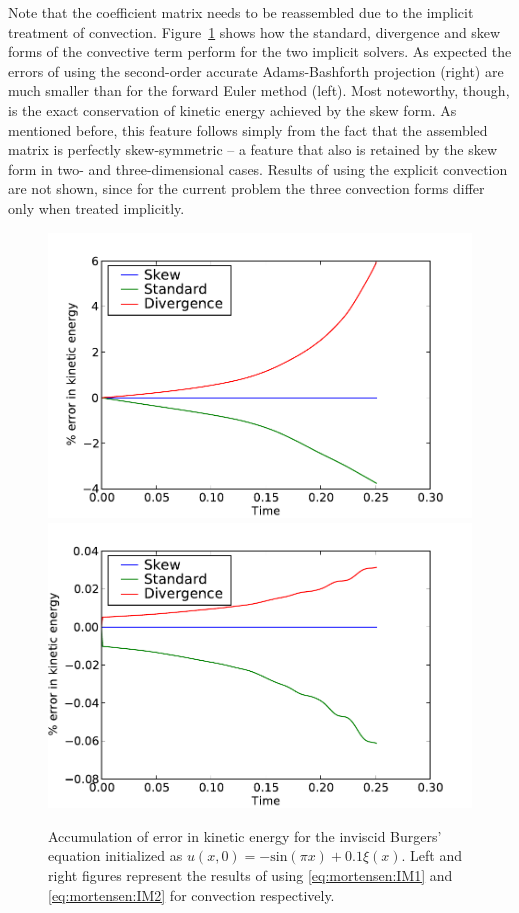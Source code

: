 Note that the coefficient matrix  needs
to be reassembled due to the implicit treatment of
convection. Figure~\ref{fig:mortensen:burgers_KE} shows how the standard,
divergence and skew forms of the convective term perform for the two
implicit solvers. As expected the errors of using the second-order
accurate Adams-Bashforth projection (right) are much smaller than for
the forward Euler method (left). Most noteworthy, though, is the exact
conservation of kinetic energy achieved by the skew form.
As mentioned before, this feature follows simply from the fact that
the assembled matrix  is perfectly skew-symmetric -- a feature
that also is retained by the skew form in two- and three-dimensional
cases. Results of using the explicit convection are not shown, since
for the current problem the three convection forms differ only when
treated implicitly.

\begin{figure}
  \centering
  \includegraphics[width=\twofigs]{chapters/mortensen/pdf/Burgers_KE_IM1.pdf}
  \includegraphics[width=\twofigs]{chapters/mortensen/pdf/Burgers_KE_IM2.pdf}
  \caption{ Accumulation of error in kinetic energy for the inviscid
    Burgers' equation initialized as $u(x,0)=-\text{sin}(\pi x)+0.1
    \xi(x)$. Left and right figures represent the results of using
    \eqref{eq:mortensen:IM1} and \eqref{eq:mortensen:IM2} for
    convection respectively. }
  \label{fig:mortensen:burgers_KE}
\end{figure}


